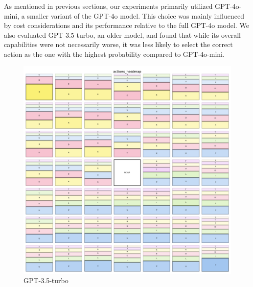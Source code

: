 As mentioned in previous sections, our experiments primarily utilized GPT-4o-mini,
a smaller variant of the GPT-4o model. This choice was mainly influenced by cost
considerations and its performance relative to the full GPT-4o model. We also evaluated
GPT-3.5-turbo, an older model, and found that while its overall capabilities were
not necessarily worse, it was less likely to select the correct action as the
one with the highest probability compared to GPT-4o-mini.

\begin{figure}[h]
  \centering
  \begin{minipage}[b]{0.32\textwidth}
    \centering
    \includegraphics[width=\textwidth]{
      images/results_discussion/models/GPT3.5-turbo/actions_heatmap.png
    }
    \caption{GPT-3.5-turbo}
    \label{fig:models_gpt35}
  \end{minipage}
  \hfill
  \begin{minipage}[b]{0.32\textwidth}
    \centering

\end{minipage}
\end{figure}
